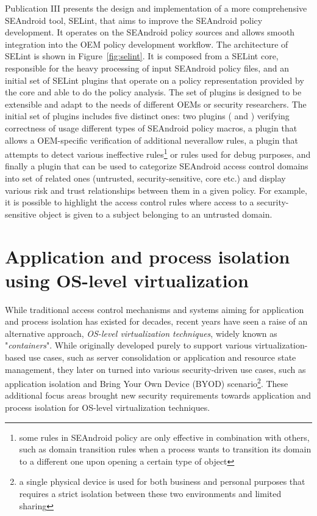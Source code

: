 Publication III presents the design and implementation of a more comprehensive SEAndroid tool, SELint, that aims to improve the SEAndroid policy development. It operates on the SEAndroid policy sources and allows smooth integration into the OEM policy development workflow. The architecture of SELint is shown in Figure~\ref{fig:selint}. It is composed from a SELint core, responsible for the heavy processing of input SEAndroid policy files, and an initial set of SELint plugins that operate on a policy representation provided by the core and able to do the policy analysis. The set of plugins is designed to be extensible and adapt to the needs of different OEMs or security researchers. The initial set of plugins includes five distinct ones: two plugins ( and ) verifying correctness of usage different types of SEAndroid policy macros, a  plugin that allows a OEM-specific verification of additional neverallow rules, a  plugin that attempts to detect various ineffective rules\footnote{some rules in SEAndroid policy are only effective in combination with others, such as domain transition rules when a process wants to transition its domain to a different one upon opening a certain type of object} or rules used for debug purposes, and finally a  plugin that can be used to categorize SEAndroid access control domains into set of related ones (untrusted, security-sensitive, core etc.) and display various risk and trust relationships between them in a given policy. For example, it is possible to highlight the access control rules where access to a security-sensitive object is given to a subject belonging to an untrusted domain.


\section{Application and process isolation using OS-level virtualization}
\label{sec:os-virt}

While traditional access control mechanisms and systems aiming for application and process isolation has existed for decades, recent years have seen a raise of an alternative approach, \textit{OS-level virtualization techniques}, widely known as "\textit{containers}". While originally developed purely to support various virtualization-based use cases, such as server consolidation or application and resource state management, they later on turned into various security-driven use cases, such as application isolation and Bring Your Own Device (BYOD) scenario\footnote{a single physical device is used for both business and personal purposes that requires a strict isolation between these two environments and limited sharing}. These additional focus areas brought new security requirements towards application and process isolation for OS-level virtualization techniques.

